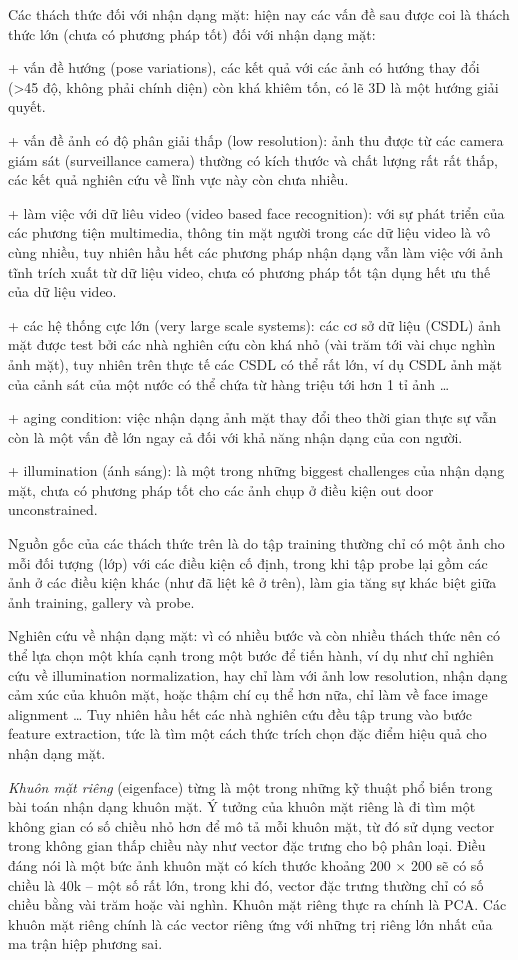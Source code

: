 Các thách thức đối với nhận dạng mặt: hiện nay các vấn đề sau được coi là thách thức lớn (chưa có phương pháp tốt) đối với nhận dạng mặt:

+ vấn đề hướng (pose variations), các kết quả với các ảnh có hướng thay đổi (>45 độ, không phải chính diện) còn khá khiêm tốn, có lẽ 3D là một hướng giải quyết.

+ vấn đề ảnh có độ phân giải thấp (low resolution): ảnh thu được từ các camera giám sát (surveillance camera) thường có kích thước và chất lượng rất rất thấp, các kết quả nghiên cứu về lĩnh vực này còn chưa nhiều.

+ làm việc với dữ liêu video (video based face recognition): với sự phát triển của các phương tiện multimedia, thông tin mặt người trong các dữ liệu video là vô cùng nhiều, tuy nhiên hầu hết các phương pháp nhận dạng vẫn làm việc với ảnh tĩnh trích xuất từ dữ liệu video, chưa có phương pháp tốt tận dụng hết ưu thế của dữ liệu video.

+ các hệ thống cực lớn (very large scale systems): các cơ sở dữ liệu (CSDL) ảnh mặt được test bởi các nhà nghiên cứu còn khá nhỏ (vài trăm tới vài chục nghìn ảnh mặt), tuy nhiên trên thực tế các CSDL có thể rất lớn, ví dụ CSDL ảnh mặt của cảnh sát của một nước có thể chứa từ hàng triệu tới hơn 1 tỉ ảnh …

+ aging condition: việc nhận dạng ảnh mặt thay đổi theo thời gian thực sự vẫn còn là một vấn đề lớn ngay cả đối với khả năng nhận dạng của con người.

+ illumination (ánh sáng): là một trong những biggest challenges của nhận dạng mặt, chưa có phương pháp tốt cho các ảnh chụp ở điều kiện out door unconstrained.

Nguồn gốc của các thách thức trên là do tập training thường chỉ có một ảnh cho mỗi đối tượng (lớp) với các điều kiện cố định, trong khi tập probe lại gồm các ảnh ở các điều kiện khác (như đã liệt kê ở trên), làm gia tăng sự khác biệt giữa ảnh training, gallery và probe.

Nghiên cứu về nhận dạng mặt: vì có nhiều bước và còn nhiều thách thức nên có thể lựa chọn một khía cạnh trong một bước để tiến hành, ví dụ như chỉ nghiên cứu về illumination normalization, hay chỉ làm với ảnh low resolution, nhận dạng cảm xúc của khuôn mặt, hoặc thậm chí cụ thể hơn nữa, chỉ làm về face image alignment … Tuy nhiên hầu hết các nhà nghiên cứu đều tập trung vào bước feature extraction, tức là tìm một cách thức trích chọn đặc điểm hiệu quả cho nhận dạng mặt.

\textit{Khuôn mặt riêng} (eigenface) từng là một trong những kỹ thuật phổ biến
trong bài toán nhận dạng khuôn mặt. Ý tưởng của khuôn mặt riêng là đi tìm một
không gian có số chiều nhỏ hơn để mô tả mỗi khuôn mặt, từ đó sử dụng vector
trong không gian thấp chiều này như vector đặc trưng cho bộ phân loại. Điều đáng
nói là một bức ảnh khuôn mặt có kích thước khoảng 200 $\times$ 200 sẽ có số
chiều là 40k -- một số rất lớn, trong khi đó, vector đặc trưng thường chỉ có số
chiều bằng vài trăm hoặc vài nghìn. Khuôn mặt riêng thực ra chính là PCA. Các
khuôn mặt riêng chính là các vector riêng ứng với những trị riêng lớn nhất của
ma trận hiệp phương sai.

